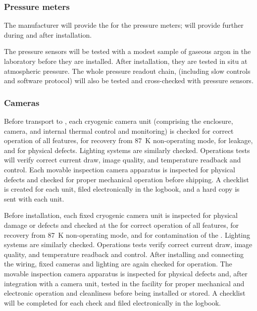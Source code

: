 \subsubsection{Pressure meters}
\label{sec:fdgen-slow-cryo-qc-press}
The manufacturer will provide the  for the pressure meters;  will provide further  during and after installation.

The pressure sensors will be tested with a modest sample of gaseous argon in the laboratory before they are installed. After installation, they are tested in situ at atmospheric pressure. The whole pressure readout chain, (including slow controls  and software protocol) 
will also be tested and cross-checked with  pressure sensors.

\subsubsection{Cameras}
\label{sec:fdgen-slow-cryo-qc-c}

Before %
transport to \surf, each cryogenic camera unit (comprising the enclosure, camera, and internal thermal control and monitoring) %
is checked for correct operation of all features, for recovery from \SI{87}{K} non-operating mode, for leakage, and for physical defects. Lighting systems %
are similarly checked. Operations tests will verify correct current draw, image quality, and temperature readback and control. Each movable inspection camera apparatus %
is inspected for physical defects and checked for proper mechanical operation before shipping. A checklist %
is created for each unit, filed electronically in the  logbook, and a hard copy is sent with each unit. 

Before installation, each fixed cryogenic camera unit is inspected for physical damage or defects and checked at the  
for correct operation of all features, for recovery from \SI{87}{K} non-operating mode, and for contamination of the . Lighting systems are similarly checked. Operations tests verify correct current draw, image quality, and temperature readback and control. After installing and connecting the wiring, fixed cameras and lighting are again  checked for operation. The movable inspection camera apparatus is inspected for physical defects and, after integration with a camera unit, tested in the facility for proper mechanical and electronic operation and cleanliness before being installed or stored. A checklist will be completed for each  check and filed electronically in the  logbook. 

